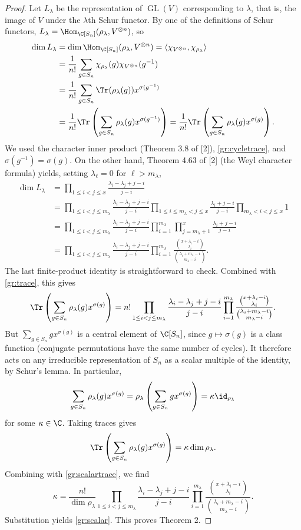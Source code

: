 \begin{proof}
Let $L_\lambda$ be the representation of $\operatorname{GL}(V)$ corresponding to $\lambda$, that is, the image of $V$ under the $\lambda$th Schur functor. By one of the definitions of Schur functors,
$L_\lambda=\Hom_{\C[S_n]}(\rho_\lambda,V^{\otimes n})$, so
\begin{align}
\dim L_\lambda
&=\dim\Hom_{\C[S_n]}(\rho_\lambda,V^{\otimes n})
=\langle\chi_{V^{\otimes n}},\chi_{\rho_\lambda}\rangle\notag\\
&=\frac1{n!}\sum_{g\in S_n}\chi_{\rho_\lambda}(g)\chi_{V^{\otimes n}}(g^{-1})\notag\\
&=\frac1{n!}\sum_{g\in S_n}\Tr(\rho_\lambda(g))x^{\sigma(g^{-1})}\notag\\
&=\frac1{n!}\Tr\left(\sum_{g\in S_n}\rho_\lambda(g)x^{\sigma(g^{-1})}\right)
=\frac1{n!}\Tr\left(\sum_{g\in S_n}\rho_\lambda(g)x^{\sigma(g)}\right).\label{gr:trace}
\end{align}
We used the character inner product (Theorem 3.8 of [2]), \eqref{gr:cycletrace}, and $\sigma(g^{-1})=\sigma(g)$.
On the other hand, Theorem 4.63 of [2] (the Weyl character formula) yields, setting $\lambda_\ell=0$ for $\ell>m_\lambda$,
\begin{align*}
\dim L_\lambda
&=\prod_{1\le i<j\le x}\frac{\lambda_i-\lambda_j+j-i}{j-i}\\
&=\prod_{1\le i<j\le m_\lambda}\frac{\lambda_i-\lambda_j+j-i}{j-i}
\prod_{1\le i\le m_\lambda<j\le x}\frac{\lambda_i+j-i}{j-i}
\prod_{m_\lambda<i<j\le x}1\\
&=\prod_{1\le i<j\le m_\lambda}\frac{\lambda_i-\lambda_j+j-i}{j-i}
\prod_{i=1}^{m_\lambda}\prod_{j=m_\lambda+1}^x\frac{\lambda_i+j-i}{j-i}\\
&=\prod_{1\le i<j\le m_\lambda}\frac{\lambda_i-\lambda_j+j-i}{j-i}
\prod_{i=1}^{m_\lambda}
\frac{\binom{x+\lambda_i-i}{\lambda_i}}
{\binom{\lambda_i+m_\lambda-i}{m_\lambda-i}}.
\end{align*}
The last finite-product identity is straightforward to check. Combined with \eqref{gr:trace}, this gives
\begin{equation}\label{gr:scalartrace}
\Tr\left(\sum_{g\in S_n}\rho_\lambda(g)x^{\sigma(g)}\right)
=n!\prod_{1\le i<j\le m_\lambda}\frac{\lambda_i-\lambda_j+j-i}{j-i}
\prod_{i=1}^{m_\lambda}
\frac{\binom{x+\lambda_i-i}{\lambda_i}}
{\binom{\lambda_i+m_\lambda-i}{m_\lambda-i}}.
\end{equation}
But $\sum_{g\in S_n}gx^{\sigma(g)}$ is a central element of $\C[S_n]$, since $g\mapsto\sigma(g)$ is a class function (conjugate permutations have the same number of cycles). It therefore acts on any irreducible representation of $S_n$ as a scalar multiple of the identity, by Schur's lemma. In particular,
\[
\sum_{g\in S_n}\rho_\lambda(g)x^{\sigma(g)}
=\rho_\lambda\left(\sum_{g\in S_n}gx^{\sigma(g)}\right)
=\kappa\id_{\rho_\lambda}
\]
for some $\kappa\in\C$. Taking traces gives
\[
\Tr\left(\sum_{g\in S_n}\rho_\lambda(g)x^{\sigma(g)}\right)=\kappa\dim\rho_\lambda.
\]
Combining with \eqref{gr:scalartrace}, we find
\[
\kappa=\frac{n!}{\dim\rho_\lambda}
\prod_{1\le i<j\le m_\lambda}\frac{\lambda_i-\lambda_j+j-i}{j-i}
\prod_{i=1}^{m_\lambda}
\frac{\binom{x+\lambda_i-i}{\lambda_i}}
{\binom{\lambda_i+m_\lambda-i}{m_\lambda-i}}.
\]
Substitution yields \eqref{gr:scalar}. This proves Theorem 2.
\end{proof}
